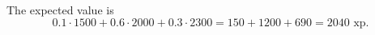 The expected value is
\[0.1\cdot1500+0.6\cdot2000+0.3\cdot2300=150+1200+690=\boxed{2040}\text{ xp}.\]
